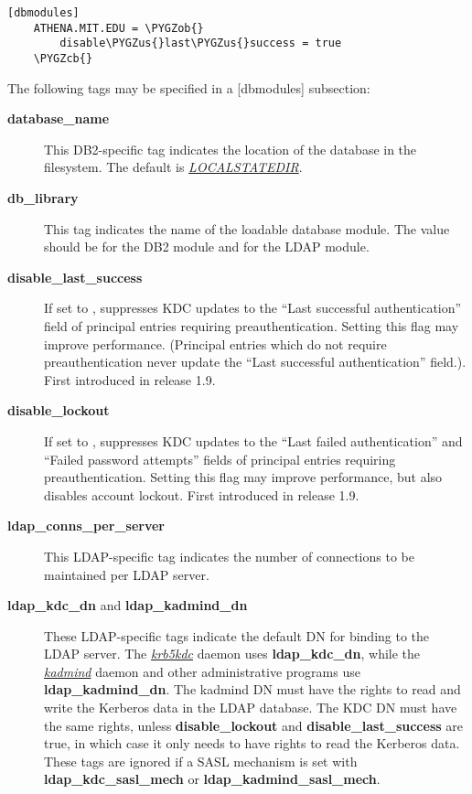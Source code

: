 \documentclass[letterpaper,10pt,english]{sphinxmanual}
\def\PYGZus{\char`\_}
\def\PYGZob{\char`\{}
\def\PYGZcb{\char`\}}
\begin{document}
\begin{Verbatim}[commandchars=\\\{\}]
[dbmodules]
    ATHENA.MIT.EDU = \PYGZob{}
        disable\PYGZus{}last\PYGZus{}success = true
    \PYGZcb{}
\end{Verbatim}

The following tags may be specified in a {[}dbmodules{]} subsection:
\begin{description}
\item[{\textbf{database\_name}}] \leavevmode
This DB2-specific tag indicates the location of the database in
the filesystem.  The default is {\hyperref[mitK5defaults:paths]{\emph{LOCALSTATEDIR}}}.

\item[{\textbf{db\_library}}] \leavevmode
This tag indicates the name of the loadable database module.  The
value should be  for the DB2 module and  for the
LDAP module.

\item[{\textbf{disable\_last\_success}}] \leavevmode
If set to , suppresses KDC updates to the ``Last successful
authentication'' field of principal entries requiring
preauthentication.  Setting this flag may improve performance.
(Principal entries which do not require preauthentication never
update the ``Last successful authentication'' field.).  First
introduced in release 1.9.

\item[{\textbf{disable\_lockout}}] \leavevmode
If set to , suppresses KDC updates to the ``Last failed
authentication'' and ``Failed password attempts'' fields of principal
entries requiring preauthentication.  Setting this flag may
improve performance, but also disables account lockout.  First
introduced in release 1.9.

\item[{\textbf{ldap\_conns\_per\_server}}] \leavevmode
This LDAP-specific tag indicates the number of connections to be
maintained per LDAP server.

\item[{\textbf{ldap\_kdc\_dn} and \textbf{ldap\_kadmind\_dn}}] \leavevmode
These LDAP-specific tags indicate the default DN for binding to
the LDAP server.  The {\hyperref[admin/admin_commands/krb5kdc:krb5kdc-8]{\emph{krb5kdc}}} daemon uses
\textbf{ldap\_kdc\_dn}, while the {\hyperref[admin/admin_commands/kadmind:kadmind-8]{\emph{kadmind}}} daemon and other
administrative programs use \textbf{ldap\_kadmind\_dn}.  The kadmind DN
must have the rights to read and write the Kerberos data in the
LDAP database.  The KDC DN must have the same rights, unless
\textbf{disable\_lockout} and \textbf{disable\_last\_success} are true, in
which case it only needs to have rights to read the Kerberos data.
These tags are ignored if a SASL mechanism is set with
\textbf{ldap\_kdc\_sasl\_mech} or \textbf{ldap\_kadmind\_sasl\_mech}.


\end{description}
\end{document}
